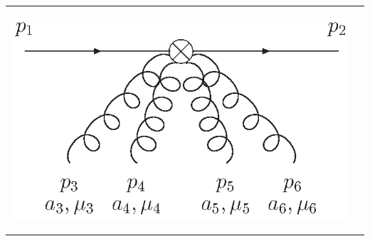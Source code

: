 \documentclass[12pt]{article}
\begin{document}
\begin{tabular}[h]{ll}
%
\hspace*{-10mm}
\begin{minipage}{3cm}
\vspace*{-5mm}
\begin{flushleft}
  \includegraphics[width=2.25\textwidth, angle=0]{OMEqqgggg}
\end{flushleft}
\end{minipage}
&
\begin{minipage}{13.0cm}
\end{minipage}
%  
\end{tabular}
\end{document}
